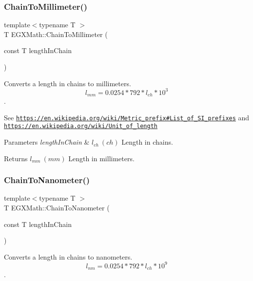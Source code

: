 \subsubsection{\texorpdfstring{Chain\+To\+Millimeter()}{ChainToMillimeter()}}
{\footnotesize\ttfamily template$<$typename T $>$ \\
T E\+G\+X\+Math\+::\+Chain\+To\+Millimeter (\begin{DoxyParamCaption}\item[{const T}]{length\+In\+Chain }\end{DoxyParamCaption})}



Converts a length in chains to millimeters. \[ l_{mm}=0.0254 * 792 * l_{ch} * 10^{3} \]. 

See \href{https://en.wikipedia.org/wiki/Metric_prefix#List_of_SI_prefixes}{\tt https\+://en.\+wikipedia.\+org/wiki/\+Metric\+\_\+prefix\#\+List\+\_\+of\+\_\+\+S\+I\+\_\+prefixes} and \href{https://en.wikipedia.org/wiki/Unit_of_length}{\tt https\+://en.\+wikipedia.\+org/wiki/\+Unit\+\_\+of\+\_\+length} 
\begin{DoxyParams}{Parameters}
{\em length\+In\+Chain} & $ l_{ch}\ (ch)$ Length in chains. \\
\hline
\end{DoxyParams}
\begin{DoxyReturn}{Returns}
$ l_{mm}\ (mm)$ Length in millimeters. 
\end{DoxyReturn}
\mbox{\label{group___e_g_x_math-_conversions-_length_conversions-_imperial-_chain-_s_i_ga6120f342646451a0aa544d3fc3699f81}} 
\subsubsection{\texorpdfstring{Chain\+To\+Nanometer()}{ChainToNanometer()}}
{\footnotesize\ttfamily template$<$typename T $>$ \\
T E\+G\+X\+Math\+::\+Chain\+To\+Nanometer (\begin{DoxyParamCaption}\item[{const T}]{length\+In\+Chain }\end{DoxyParamCaption})}



Converts a length in chains to nanometers. \[ l_{nm}=0.0254 * 792 * l_{ch} * 10^{9} \]. 

